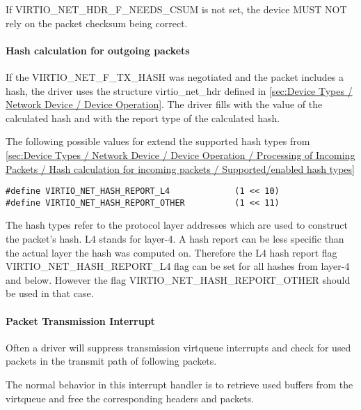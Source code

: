 If VIRTIO_NET_HDR_F_NEEDS_CSUM is not set, the device MUST NOT
rely on the packet checksum being correct.

\paragraph{Hash calculation for outgoing packets}
\label{sec:Device Types / Network Device / Device Operation / Packet Transmission / Hash calculation for outgoing packets }

If the VIRTIO_NET_F_TX_HASH was negotiated and the packet includes a hash, the driver uses
the structure virtio_net_hdr defined in \ref{sec:Device Types / Network Device / Device Operation}.
The driver fills  with the value of the calculated hash and 
with the report type of the calculated hash.

The following possible values for  extend the supported hash types from
\ref{sec:Device Types / Network Device / Device Operation / Processing of Incoming Packets / Hash calculation for incoming packets / Supported/enabled hash types}

\begin{lstlisting}
#define VIRTIO_NET_HASH_REPORT_L4             (1 << 10)
#define VIRTIO_NET_HASH_REPORT_OTHER          (1 << 11)
\end{lstlisting}

The hash types refer to the protocol layer addresses which are used to
construct the packet's hash. L4 stands for layer-4.
A hash report can be less specific than the actual layer the hash was
computed on. Therefore the L4 hash report flag VIRTIO_NET_HASH_REPORT_L4
flag can be set for all hashes from layer-4 and below. However the flag
VIRTIO_NET_HASH_REPORT_OTHER should be used in that case.

\paragraph{Packet Transmission Interrupt}\label{sec:Device Types / Network Device / Device Operation / Packet Transmission / Packet Transmission Interrupt}

Often a driver will suppress transmission virtqueue interrupts
and check for used packets in the transmit path of following
packets.

The normal behavior in this interrupt handler is to retrieve
used buffers from the virtqueue and free the corresponding
headers and packets.

